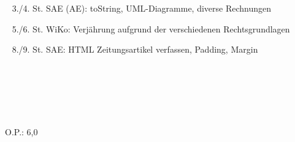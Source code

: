 {{	\textbullet~ 3./4. St. SAE (AE): toString, UML-Diagramme, diverse Rechnungen\par
	\textbullet~ 5./6. St. WiKo: Verjährung aufgrund der verschiedenen Rechtsgrundlagen\par
	\textbullet~ 8./9. St. SAE: HTML Zeitungsartikel verfassen, Padding, Margin\par
	\textbullet~ \par
	\textbullet~ \par
	\textbullet~ 
	}{}{O.P.: 6,0}
}{}
\Unterschrift
\newpage

